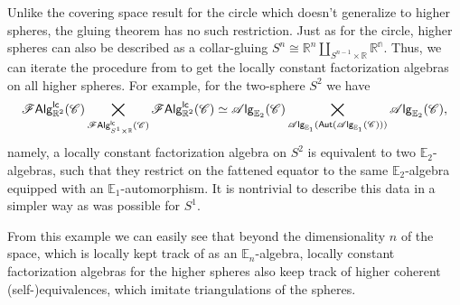 \documentclass[../text]{subfiles}
\begin{document}
\begin{example}\label{ex:lcfas_on_S^n}
    Unlike the covering space result for the circle \cite[sec.5.5]{ginot2015} which doesn't generalize to higher spheres, the gluing theorem has no such restriction. Just as for the circle, higher spheres can also be described as a collar-gluing $S^n \cong \mathbb{R}^n \coprod_{S^{n-1} \times \mathbb{R}} \mathbb{R^n}$. Thus, we can iterate the procedure from  to get the locally constant factorization algebras on all higher spheres. For example, for the two-sphere $S^2$ we have
    \begin{equation}
        \mathscr{F} \mathsf{Alg}^{\mathsf{lc}}_{\mathbb{R}^2}(\mathscr{C}) \bigtimes_{\mathscr{F} \mathsf{Alg}^{\mathsf{lc}}_{S^1 \times \mathbb{R}}(\mathscr{C})} \mathscr{F} \mathsf{Alg}^{\mathsf{lc}}_{\mathbb{R}^2}(\mathscr{C}) \simeq \mathscr{A} \mathsf{lg}_{\mathbb{E}_2}(\mathscr{C}) \bigtimes_{\mathscr{A} \mathsf{lg}_{\mathbb{E}_1}( \mathsf{Aut} (\mathscr{A} \mathsf{lg}_{\mathbb{E}_1} (\mathscr{C}))) } \mathscr{A} \mathsf{lg}_{\mathbb{E}_2} (\mathscr{C}),
    \end{equation}
    namely, a locally constant factorization algebra on $S^2$ is equivalent to two $\mathbb{E}_2$-algebras, such that they restrict on the fattened equator to the same $\mathbb{E}_2$-algebra equipped with an $\mathbb{E}_1$-automorphism. It is nontrivial to describe this data in a simpler way as was possible for $S^1$.
    
    From this example we can easily see that beyond the dimensionality $n$ of the space, which is locally kept track of as an $\mathbb{E}_n$-algebra, locally constant factorization algebras for the higher spheres also keep track of higher coherent (self-)equivalences, which imitate triangulations of the spheres.
\end{example}
\end{document}
